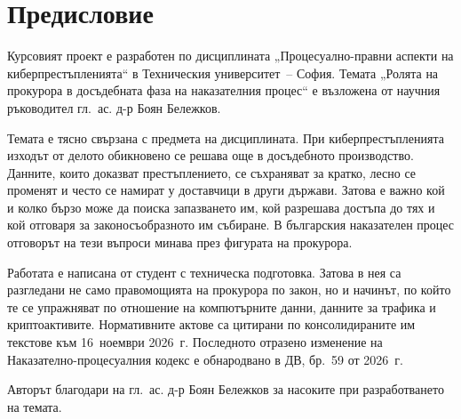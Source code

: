 \section*{Предисловие}
\label{sec:predislovie}

Курсовият проект е разработен по дисциплината „Процесуално-правни аспекти на
киберпрестъпленията“ в Техническия университет~-- София. Темата „Ролята на прокурора в
досъдебната фаза на наказателния процес“ е възложена от научния ръководител
гл.~ас. д-р Боян Бележков.

Темата е тясно свързана с предмета на дисциплината. При киберпрестъпленията изходът от
делото обикновено се решава още в досъдебното производство.
Данните, които доказват престъплението, се съхраняват за кратко, лесно се променят и
често се намират у доставчици в други държави. Затова е важно кой и колко бързо може да
поиска запазването им, кой разрешава достъпа до тях и кой отговаря за законосъобразното
им събиране. В българския наказателен процес отговорът на тези въпроси минава през
фигурата на прокурора.

Работата е написана от студент с техническа подготовка. Затова в нея са разгледани не
само правомощията на прокурора по закон, но и начинът, по който те се упражняват по отношение на
компютърните данни, данните за трафика и криптоактивите. Нормативните актове са
цитирани по консолидираните им текстове към 16~ноември 2026~г. Последното отразено
изменение на Наказателно-процесуалния кодекс е обнародвано в ДВ, бр.~59 от 2026~г.

Авторът благодари на гл.~ас. д-р Боян Бележков за насоките при разработването на темата.
